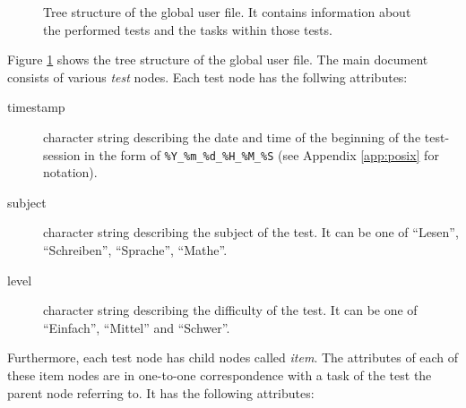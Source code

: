 \documentclass{scrartcl}
\begin{document}
\begin{figure}
\begin{center}
\end{center}
\caption{Tree structure of the global user file. It contains information about the performed tests and the tasks within those tests.}
\label{fig:guf}
\end{figure}
Figure \ref{fig:guf} shows the tree structure of the global user file. The main document consists of various \emph{test} nodes. Each test node has the follwing attributes:
\begin{description}
\item[timestamp] character string describing the date and time of the beginning of the test-session in the form of \verb+%Y_%m_%d_%H_%M_%S+ (see Appendix \ref{app:posix} for notation).
\item[subject] character string describing the subject of the test. It can be one of ``Lesen'', ``Schreiben'', ``Sprache'', ``Mathe''.
\item[level] character string describing the difficulty of the test. It can be one of ``Einfach'', ``Mittel'' and ``Schwer''. 
\end{description}
Furthermore, each test node has child nodes called \emph{item}. The attributes of each of these item nodes are in one-to-one correspondence with a task of the test the parent node referring to. It has the following attributes:
\end{document}

